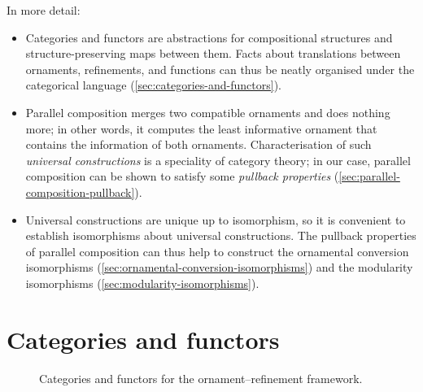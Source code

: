 In more detail:
\begin{itemize}
\item Categories and functors are abstractions for compositional structures and structure-preserving maps between them.
Facts about translations between ornaments, refinements, and functions can thus be neatly organised under the categorical language (\autoref{sec:categories-and-functors}).
\item Parallel composition merges two compatible ornaments and does nothing more; in other words, it computes the least informative ornament that contains the information of both ornaments.
Characterisation of such \emph{universal constructions} is a speciality of category theory; in our case, parallel composition can be shown to satisfy some \emph{pullback properties} (\autoref{sec:parallel-composition-pullback}).
\item Universal constructions are unique up to isomorphism, so it is convenient to establish isomorphisms about universal constructions.
The pullback properties of parallel composition can thus help to construct the ornamental conversion isomorphisms (\autoref{sec:ornamental-conversion-isomorphisms}) and the modularity isomorphisms (\autoref{sec:modularity-isomorphisms}).
\end{itemize}


\section{Categories and functors}
\label{sec:categories-and-functors}

\begin{figure}
\begin{center}
\end{center}
\caption{Categories and functors for the ornament--refinement framework.}
\label{fig:categories}
\end{figure}

